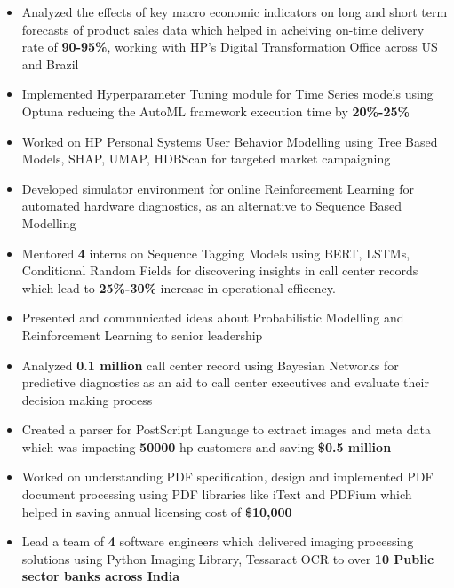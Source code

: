 \documentclass[10pt,a4paper,ragged2e,withhyper]{altacv}
\begin{document}
\begin{paracol}{1}
\par\divider
{}

\begin{itemize}
\item Analyzed the effects of key macro economic indicators on long and short
term forecasts of product sales data which helped in acheiving on-time
delivery rate of \textbf{\textbf{90-95\%}}, working with HP's Digital Transformation Office
across US and Brazil
\item Implemented Hyperparameter Tuning module for Time Series models using Optuna
reducing the AutoML framework execution time by \textbf{\textbf{20\%-25\%}}
\item Worked on HP Personal Systems User Behavior Modelling using Tree Based Models,
SHAP, UMAP, HDBScan for targeted market campaigning
\item Developed simulator environment for online Reinforcement Learning for
automated hardware diagnostics, as an alternative to Sequence Based Modelling
\item Mentored \textbf{\textbf{4}} interns on Sequence Tagging Models using BERT, LSTMs,
Conditional Random Fields for discovering insights in call center records
which lead to \textbf{\textbf{25\%-30\%}} increase in operational efficency.
\item Presented and communicated ideas about Probabilistic Modelling and
Reinforcement Learning to senior leadership
\item Analyzed \textbf{\textbf{0.1 million}} call center record using Bayesian Networks for predictive
diagnostics as an aid to call center executives and evaluate their decision
making process
\end{itemize}


\par\divider
{}
\begin{itemize}
\item Created a parser for PostScript Language to extract images and
meta data which was impacting \textbf{\textbf{50000}} hp customers and saving \textbf{\textbf{\$0.5 million}}
\item Worked on understanding PDF specification, design and implemented PDF document
processing using PDF libraries like iText and PDFium which helped in saving
annual licensing cost of \textbf{\textbf{\$10,000}}
\item Lead a team of \textbf{\textbf{4}} software engineers which delivered imaging processing solutions using
Python Imaging Library, Tessaract OCR to over \textbf{\textbf{10 Public sector banks across India}}
\end{itemize}


\end{paracol}
\end{document}
